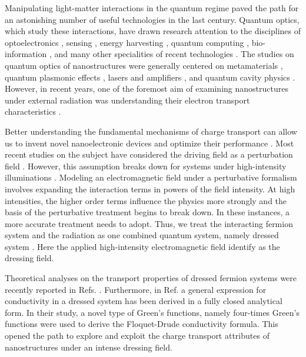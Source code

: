 
Manipulating light-matter interactions in the quantum regime paved the path for an astonishing number of useful technologies in the last century. Quantum optics, which study these interactions, have drawn research attention to the disciplines of optoelectronics \cite{liu16,wijesekara20,tao21}, sensing \cite{rodrigo2015,pirandola18,hapuarachchi2018}, energy harvesting \cite{yuan16,sun18},
quantum computing \cite{huh15,slussarenko19,andersen21}, bio-information \cite{marais18,bian20}, and many other specialities of recent technologies \cite{rivera20}.
The studies on quantum optics of nanostructures were generally centered on metamaterials \cite{shalaev07,si14}, quantum plasmonic effects \cite{hapuarachchi19,perera20}, lasers and amplifiers \cite{zhang05,chow13}, and quantum cavity physics \cite{tsang10,devi20}.
However, in recent years, one of the foremost aim of examining nanostructures under external radiation was understanding their electron transport characteristics \cite{kitagawa11,zhou11,kibis14,pervishko15,morina15,dehghani15,dini16,wackerl20}.

Better understanding the fundamental mechanisms of charge transport can allow us to invent novel nanoelectronic devices and optimize their performance \cite{premaratne21}.
Most recent studies on the subject have considered the driving field as a perturbation field \cite{pervishko15,morina15}. However, this assumption breaks down for systems under high-intensity illuminations \cite{grifoni98,wackerl20}.
Modeling an electromagnetic field under a perturbative formalism involves expanding the interaction terms in powers of the field intensity. At high intensities, the higher order terms influence the physics more strongly and the basis of the perturbative treatment begins to break down.
In these instances, a more accurate treatment needs to adopt. Thus, we treat the interacting fermion system and the radiation as one combined quantum system, namely dressed system \cite{morina15,cohen98,scully01}. Here the applied high-intensity  electromagnetic field identify as the dressing field.

Theoretical analyses on the transport properties of dressed fermion systems were recently reported in Refs. \cite{kibis14,morina15,wackerl20}.
Furthermore, in Ref. \cite{wackerl20} a general expression for conductivity in a dressed system has been derived in a fully closed analytical form. In their study, a novel type of Green’s functions, namely four-times Green’s functions were used to derive the Floquet-Drude conductivity formula. This opened the path to explore and exploit the charge transport attributes of nanostructures under an intense dressing field.

